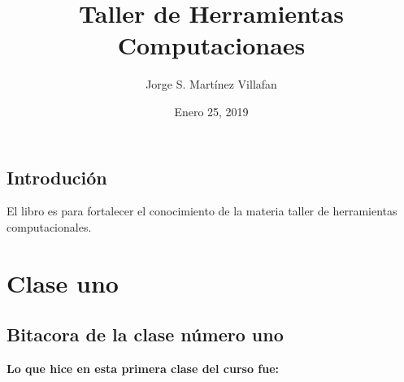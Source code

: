 \documentclass{book}
\title{ Taller de Herramientas Computacionaes}
\author{Jorge S. Martínez Villafan}
\date{Enero 25, 2019}
\begin{document}
\maketitle
\tableofcontents
\section*{Introdución} El libro es para fortalecer el conocimiento de la materia taller de herramientas computacionales.


\chapter{Clase uno}
\section{Bitacora de la clase número uno}
\textbf{Lo que hice en esta primera clase del curso fue:}
\end{document}
